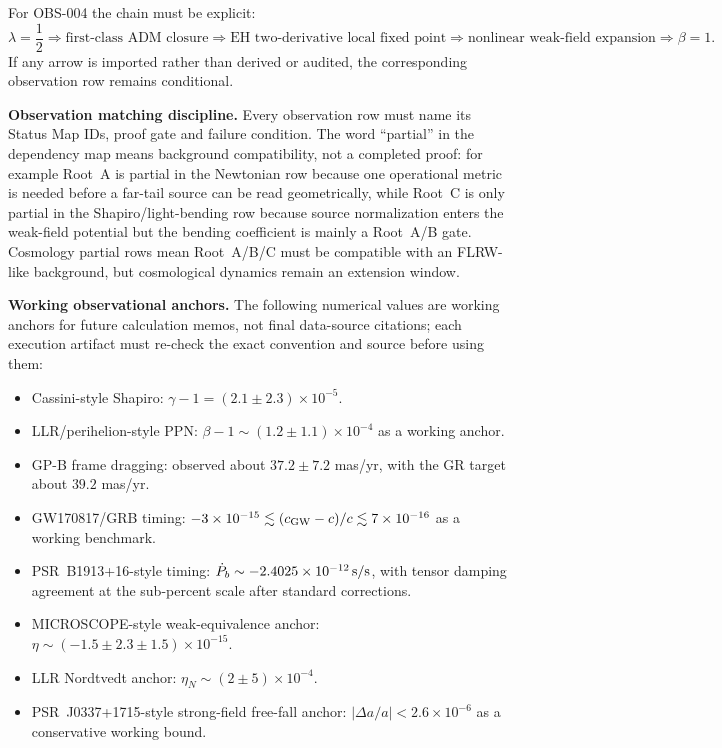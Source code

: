 \documentclass[11pt]{article}
\begin{document}
For OBS-004 the chain must be explicit:
\[
\boxed{
\lambda=\frac12
\Rightarrow
\text{first-class ADM closure}
\Rightarrow
\text{EH two-derivative local fixed point}
\Rightarrow
\text{nonlinear weak-field expansion}
\Rightarrow
\beta=1.
}
\]
If any arrow is imported rather than derived or audited, the corresponding
observation row remains conditional.

\medskip\noindent\textbf{Observation matching discipline.}
Every observation row must name its Status Map IDs, proof gate and failure
condition.  The word ``partial'' in the dependency map means background
compatibility, not a completed proof: for example Root~A is partial in the
Newtonian row because one operational metric is needed before a far-tail
source can be read geometrically, while Root~C is only partial in the
Shapiro/light-bending row because source normalization enters the weak-field
potential but the bending coefficient is mainly a Root~A/B gate.  Cosmology
partial rows mean Root~A/B/C must be compatible with an FLRW-like background,
but cosmological dynamics remain an extension window.

\medskip\noindent\textbf{Working observational anchors.}
The following numerical values are working anchors for future calculation
memos, not final data-source citations; each execution artifact must re-check
the exact convention and source before using them:
\begin{itemize}
\item Cassini-style Shapiro: \(\gamma-1=(2.1\pm2.3)\times10^{-5}\).
\item LLR/perihelion-style PPN: \(\beta-1\sim(1.2\pm1.1)\times10^{-4}\) as a
  working anchor.
\item GP-B frame dragging: observed about \(37.2\pm7.2\) mas/yr, with the GR
  target about \(39.2\) mas/yr.
\item GW170817/GRB timing: \(-3\times10^{-15}\lesssim(c_{\rm GW}-c)/c
  \lesssim7\times10^{-16}\) as a working benchmark.
\item PSR~B1913+16-style timing: \(\dot P_b\sim-2.4025\times10^{-12}\,{\rm s/s}\),
  with tensor damping agreement at the sub-percent scale after standard
  corrections.
\item MICROSCOPE-style weak-equivalence anchor:
  \(\eta\sim(-1.5\pm2.3\pm1.5)\times10^{-15}\).
\item LLR Nordtvedt anchor: \(\eta_N\sim(2\pm5)\times10^{-4}\).
\item PSR~J0337+1715-style strong-field free-fall anchor:
  \(|\Delta a/a|<2.6\times10^{-6}\) as a conservative working bound.
\end{itemize}
\end{document}

